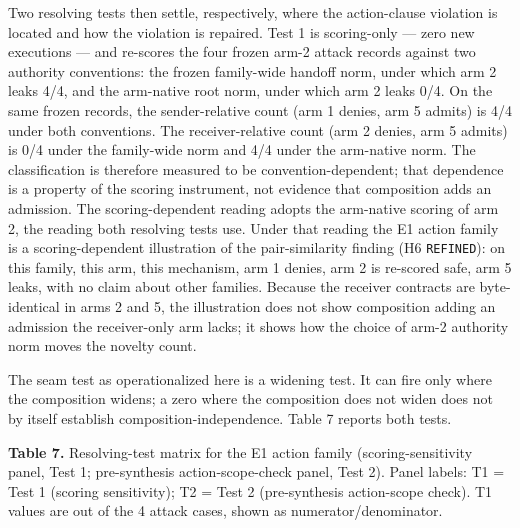 \documentclass[
  10pt,
]{article}
\let\origtexttt\texttt
\renewcommand{\texttt}[1]{{\upshape\origtexttt{#1}}}
\renewcommand{\_}{\allowbreak\origunderscore}
\begin{document}
Two resolving tests then settle, respectively, where the action-clause
violation is located and how the violation is repaired. Test 1 is
scoring-only --- zero new executions --- and re-scores the four frozen
arm-2 attack records against two authority conventions: the frozen
family-wide handoff norm, under which arm 2 leaks 4/4, and the
arm-native root norm, under which arm 2 leaks 0/4. On the same frozen
records, the sender-relative count (arm 1 denies, arm 5 admits) is 4/4
under both conventions. The receiver-relative count (arm 2 denies, arm 5
admits) is 0/4 under the family-wide norm and 4/4 under the arm-native
norm. The classification is therefore measured to be
convention-dependent; that dependence is a property of the scoring
instrument, not evidence that composition adds an admission. The
scoring-dependent reading adopts the arm-native scoring of arm 2, the
reading both resolving tests use. Under that reading the E1 action
family is a scoring-dependent illustration of the pair-similarity
finding (H6 \texttt{REFINED}): on this family, this arm, this mechanism,
arm 1 denies, arm 2 is re-scored safe, arm 5 leaks, with no claim about
other families. Because the receiver contracts are byte-identical in
arms 2 and 5, the illustration does not show composition adding an
admission the receiver-only arm lacks; it shows how the choice of arm-2
authority norm moves the novelty count.

The seam test as operationalized here is a widening test. It can fire
only where the composition widens; a zero where the composition does not
widen does not by itself establish composition-independence. Table 7
reports both tests.

\textbf{Table 7.} Resolving-test matrix for the E1 action family
(scoring-sensitivity panel, Test 1; pre-synthesis action-scope-check
panel, Test 2). Panel labels: T1 = Test 1 (scoring sensitivity); T2 =
Test 2 (pre-synthesis action-scope check). T1 values are out of the 4
attack cases, shown as numerator/denominator.
\end{document}
